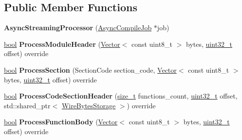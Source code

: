 \subsection*{Public Member Functions}
\begin{DoxyCompactItemize}
\item 
\mbox{\label{classv8_1_1internal_1_1wasm_1_1AsyncStreamingProcessor_a9da068ebd21214867da972e51689bee5}} 
{\bfseries Async\+Streaming\+Processor} (\mbox{\hyperlink{classv8_1_1internal_1_1wasm_1_1AsyncCompileJob}{Async\+Compile\+Job}} $\ast$job)
\item 
\mbox{\label{classv8_1_1internal_1_1wasm_1_1AsyncStreamingProcessor_ad0ce6ccb29f971786defc2c2ef8a727a}} 
\mbox{\hyperlink{classbool}{bool}} {\bfseries Process\+Module\+Header} (\mbox{\hyperlink{classv8_1_1internal_1_1Vector}{Vector}}$<$ const uint8\+\_\+t $>$ bytes, \mbox{\hyperlink{classuint32__t}{uint32\+\_\+t}} offset) override
\item 
\mbox{\label{classv8_1_1internal_1_1wasm_1_1AsyncStreamingProcessor_aaa6e1d9497457e5a257a709da4818786}} 
\mbox{\hyperlink{classbool}{bool}} {\bfseries Process\+Section} (Section\+Code section\+\_\+code, \mbox{\hyperlink{classv8_1_1internal_1_1Vector}{Vector}}$<$ const uint8\+\_\+t $>$ bytes, \mbox{\hyperlink{classuint32__t}{uint32\+\_\+t}} offset) override
\item 
\mbox{\label{classv8_1_1internal_1_1wasm_1_1AsyncStreamingProcessor_a6b2d28acd23f1a0029bdbb7198cb7f19}} 
\mbox{\hyperlink{classbool}{bool}} {\bfseries Process\+Code\+Section\+Header} (\mbox{\hyperlink{classsize__t}{size\+\_\+t}} functions\+\_\+count, \mbox{\hyperlink{classuint32__t}{uint32\+\_\+t}} offset, std\+::shared\+\_\+ptr$<$ \mbox{\hyperlink{classv8_1_1internal_1_1wasm_1_1WireBytesStorage}{Wire\+Bytes\+Storage}} $>$) override
\item 
\mbox{\label{classv8_1_1internal_1_1wasm_1_1AsyncStreamingProcessor_a254e2b58ae9aea32a5b7598d6db9f80d}} 
\mbox{\hyperlink{classbool}{bool}} {\bfseries Process\+Function\+Body} (\mbox{\hyperlink{classv8_1_1internal_1_1Vector}{Vector}}$<$ const uint8\+\_\+t $>$ bytes, \mbox{\hyperlink{classuint32__t}{uint32\+\_\+t}} offset) override

\end{DoxyCompactItemize}

